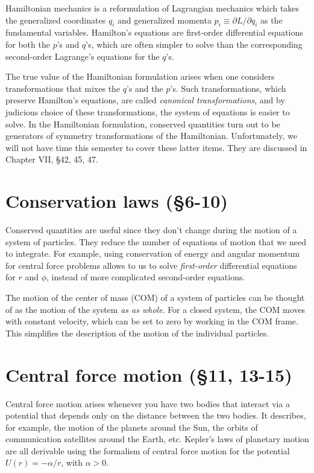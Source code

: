 \documentclass[10pt]{article}
\numberwithin{equation}{section}
\begin{document}
Hamiltonian mechanics is a reformulation of 
Lagrangian mechanics which takes the generalized
coordinates $q_i$ and generalized momenta 
$p_i\equiv \partial L/\partial q_i$
as the fundamental variables.
Hamilton's equations are first-order differential
equations for both the $p$'s and $q$'s, which are 
often simpler to solve than the corresponding 
second-order Lagrange's equations for the $q$'s.

The true value of the Hamiltonian formulation arises 
when one considers transformations that mixes the 
$q$'s and the $p$'s.  
Such transformations, which preserve Hamilton's equations,
are called {\em canonical transformations},
and by judicious choice of these transformations, the 
system of equations is easier to solve.
In the Hamiltonian formulation, conserved quantities
turn out to be generators of symmetry transformations of
the Hamiltonian.
Unfortunately, we will not have time this semester to 
cover these latter items.
They are discussed in Chapter VII, \S 42, 45, 47.

\section{Conservation laws (\S6-10)}

Conserved quantities are useful since they don't change
during the motion of a system of particles.
They reduce the number of equations of motion that we
need to integrate.
For example, using conservation of energy and angular
momentum for central force problems allows to us to 
solve {\em first-order} differential equations for $r$ and $\phi$, 
instead of more complicated second-order equations.

The motion of the center of mass (COM) of a system of 
particles can be thought of as the motion of the system 
{\em as as whole}.  
For a closed system, the COM moves with constant velocity, 
which can be set to zero by working in the COM frame.
This simplifies the description of the motion of the 
individual particles.

\section{Central force motion (\S11, 13-15)}

Central force motion arises whenever you have 
two bodies that interact via a potential that depends
only on the distance between the two bodies.
It describes, for example, the motion of the planets 
around the Sun, the orbits of communication satellites 
around the Earth, etc.
Kepler's laws of planetary motion are all derivable
using the formalism of central force motion for the 
potential $U(r)= -\alpha/r$, with $\alpha>0$.
\end{document}
